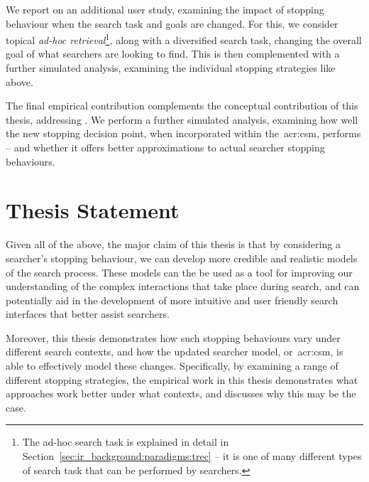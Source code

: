 \noindent
{} We report on an additional user study, examining the impact of stopping behaviour when the search task and goals are changed. For this, we consider topical \emph{ad-hoc retrieval}\footnote{The ad-hoc search task is explained in detail in Section~\ref{sec:ir_background:paradigms:trec} -- it is one of many different types of search task that can be performed by searchers.}\emph{,} along with a diversified search task, changing the overall goal of what searchers are looking to find. This is then complemented with a further simulated analysis, examining the individual stopping strategies like above.

 The final empirical contribution complements the conceptual contribution of this thesis, addressing . We perform a further simulated analysis, examining how well the new stopping decision point, when incorporated within the~\gls{acr:csm}, performs -- and whether it offers better approximations to actual searcher stopping behaviours.

\section{Thesis Statement}
Given all of the above, the major claim of this thesis is that by considering a searcher's stopping behaviour, we can develop more credible and realistic models of the search process. These models can the be used as a tool for improving our understanding of the complex interactions that take place during search, and can potentially aid in the development of more intuitive and user friendly search interfaces that better assist searchers.

Moreover, this thesis demonstrates how such stopping behaviours vary under different search contexts, and how the updated searcher model, or~\gls{acr:csm}, is able to effectively model these changes. Specifically, by examining a range of different stopping strategies, the empirical work in this thesis demonstrates what approaches work better under what contexts, and discusses why this may be the case.

%

